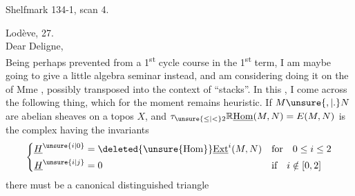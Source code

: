 Shelfmark 134-1, scan 4.


\noindent\hfill Lodève, 27.\\
Dear Deligne,\\
Being perhaps prevented   from  a 1\textsuperscript{st} cycle course in the 1\textsuperscript{st} term, I am maybe going to give a little algebra seminar instead, and am considering doing it on the  of Mme , possibly transposed into the context of ``stacks''. In this , I come across the following thing, which for the moment remains heuristic. If $M\unsure{,|.}N$ are  abelian sheaves on a topos $X$, and $\tau_{\unsure{\leq|<}2}\mathbb{R}\underline{\mathrm{Hom}}(M,N)=E(M,N)$ is the complex having the invariants
\[
\left\{\begin{aligned}
\underline{H}^{\unsure{i|0}} &= \deleted{\unsure{\mathrm{Hom}}}\underline{\mathrm{Ext}}^{i}(M,N)  && \text{for}\quad 0\leq i\leq 2\\
\underline{H}^{\unsure{i|j}} &= 0 && \text{if}\quad i\notin[0,2]
\end{aligned}\right.
\]
there must be a canonical distinguished triangle

